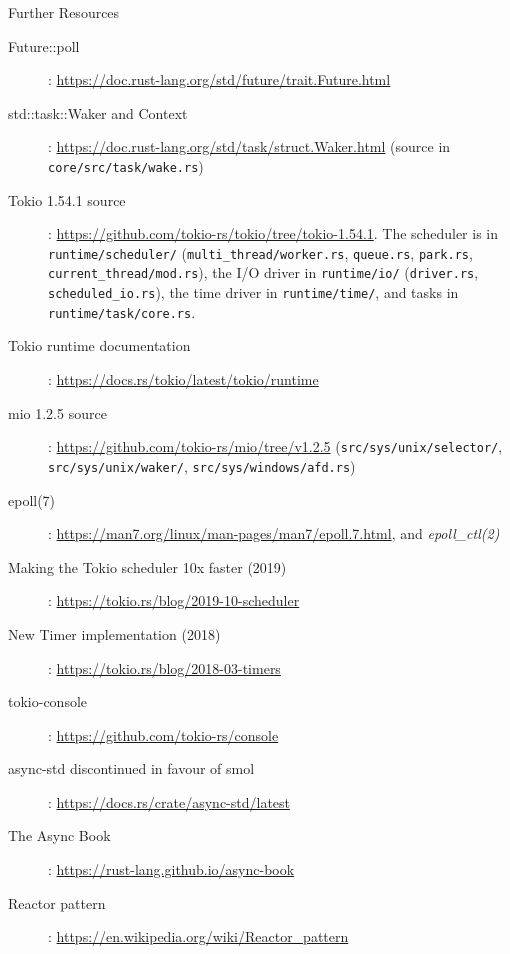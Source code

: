 \begin{refbox}{Further Resources}
    \small
    \begin{description}
        \item [Future::poll]: \href{https://doc.rust-lang.org/std/future/trait.Future.html}{https://doc.rust-lang.org/std/future/trait.Future.html}
        \item [std::task::Waker and Context]: \href{https://doc.rust-lang.org/std/task/struct.Waker.html}{https://doc.rust-lang.org/std/task/struct.Waker.html} (source in \texttt{core/src/task/wake.rs})
        \item [Tokio 1.54.1 source]: \href{https://github.com/tokio-rs/tokio/tree/tokio-1.54.1}{https://github.com/tokio-rs/tokio/tree/tokio-1.54.1}. The scheduler is in \texttt{runtime/scheduler/} (\texttt{multi\_thread/worker.rs}, \texttt{queue.rs}, \texttt{park.rs}, \texttt{current\_thread/mod.rs}), the I/O driver in \texttt{runtime/io/} (\texttt{driver.rs}, \texttt{scheduled\_io.rs}), the time driver in \texttt{runtime/time/}, and tasks in \texttt{runtime/task/core.rs}.
        \item [Tokio runtime documentation]: \href{https://docs.rs/tokio/latest/tokio/runtime}{https://docs.rs/tokio/latest/tokio/runtime}
        \item [mio 1.2.5 source]: \href{https://github.com/tokio-rs/mio/tree/v1.2.5}{https://github.com/tokio-rs/mio/tree/v1.2.5} (\texttt{src/sys/unix/selector/}, \texttt{src/sys/unix/waker/}, \texttt{src/sys/windows/afd.rs})
        \item [epoll(7)]: \href{https://man7.org/linux/man-pages/man7/epoll.7.html}{https://man7.org/linux/man-pages/man7/epoll.7.html}, and \textit{epoll\_ctl(2)}
        \item [Making the Tokio scheduler 10x faster (2019)]: \href{https://tokio.rs/blog/2019-10-scheduler}{https://tokio.rs/blog/2019-10-scheduler}
        \item [New Timer implementation (2018)]: \href{https://tokio.rs/blog/2018-03-timers}{https://tokio.rs/blog/2018-03-timers}
        \item [tokio-console]: \href{https://github.com/tokio-rs/console}{https://github.com/tokio-rs/console}
        \item [async-std discontinued in favour of smol]: \href{https://docs.rs/crate/async-std/latest}{https://docs.rs/crate/async-std/latest}
        \item [The Async Book]: \href{https://rust-lang.github.io/async-book}{https://rust-lang.github.io/async-book}
        \item [Reactor pattern]: \href{https://en.wikipedia.org/wiki/Reactor_pattern}{https://en.wikipedia.org/wiki/Reactor\_pattern}
    \end{description}
\end{refbox}
